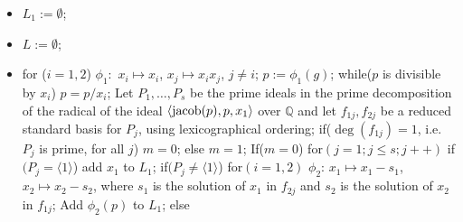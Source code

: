 \documentclass[noend]{amsproc}
\begin{document}
\begin{itemize}
\item $L_1:=\emptyset$;
\item $L:=\emptyset$;
\item for ($i=1,2$)\newline
\phantom{}\quad $\phi_1:$ $x_i\mapsto x_i$, $x_j\mapsto x_ix_j$,
$j\neq i$;\newline
\phantom{}\quad $p:=\phi_1(g)$;\newline
\phantom{}\quad while($p$ is divisible by $x_i$)\newline
\phantom{}\quad\quad $p=p/x_i$;\newline
\phantom{}\quad Let $P_1,\ldots,P_s$ be the prime ideals in the prime
decomposition\newline
\phantom{}\quad of the radical of the ideal
$\langle\textnormal{jacob}(p),p,x_1\rangle$ over $\mathbb Q$ and let\newline
\phantom{}\quad $f_{1j}, f_{2j}$ be a reduced standard basis for $P_j$, using
lexicographical \newline
\phantom{}\quad ordering;\newline
\phantom{}\quad\quad if($\deg(f_{1j})=1$, i.e.~$P_j$ is prime, for all $j$)
\newline
\phantom{}\quad\quad\quad $m=0$;\newline
\phantom{}\quad\quad else\newline
\phantom{}\quad\quad\quad $m=1$;\newline
\phantom{}\quad\quad If($m=0$)\newline
\phantom{}\quad\quad\quad for$(j=1; j\le s;j++)$\newline
\phantom{}\quad\quad\quad\quad if$(P_j=\langle 1\rangle$)\newline
\phantom{}\quad\quad\quad\quad\quad add $x_1$ to $L_1$;\newline
\phantom{}\quad\quad\quad\quad if$(P_j\neq\langle 1\rangle$)\newline
\phantom{}\quad\quad\quad\quad\quad for$(i=1,2)$\newline
\phantom{}\quad\quad\quad\quad\quad\quad $\phi_2$: $x_1\mapsto x_1-s_1$,
$x_2\mapsto x_2-s_2$, where $s_1$ is the solution of  \newline
\phantom{}\quad\quad\quad\quad\quad\quad $x_1$ in $f_{2j}$ and $s_2$ is the
solution of $x_2$ in $f_{1j}$;\newline
\phantom{}\quad\quad\quad\quad\quad\quad Add $\phi_2(p)$ to $L_1$;\newline
\phantom{}\quad\quad else\newline

\end{itemize}
\end{document}
